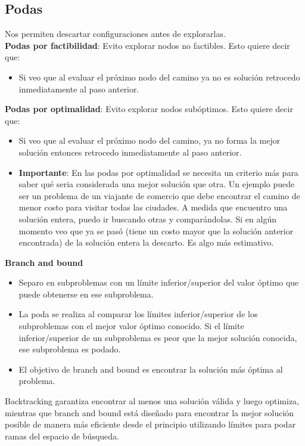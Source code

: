 \documentclass[10pt,a4paper]{article}
\begin{document}
\subsection*{Podas}
Nos permiten descartar configuraciones antes de explorarlas. \\
\textbf{Podas por factibilidad}: Evito explorar nodos no factibles. Esto quiere decir que:
\begin{itemize}
    \item Si veo que al evaluar el próximo nodo del camino ya no es solución retrocedo inmediatamente al paso anterior.
\end{itemize}
\textbf{Podas por optimalidad}: Evito explorar nodos subóptimos. Esto quiere decir que: 
\begin{itemize}
    \item Si veo que al evaluar el próximo nodo del camino, ya no forma la mejor solución entonces retrocedo inmediatamente al paso anterior.
    \item \textbf{Importante}: En las podas por optimalidad se necesita un criterio más para saber qué seria considerada una mejor solución que otra. Un ejemplo puede ser un problema de un viajante de comercio que debe encontrar el camino de menor costo para visitar todas las ciudades. A medida que encuentro una solución entera, puedo ir buscando otras y comparándolas. Si en algún momento veo que ya se pasó (tiene un costo mayor que la solución anterior encontrada) de la solución entera la descarto. Es algo más estimativo.
\end{itemize}
\textbf{Branch and bound} 
\begin{itemize}
    \item Separo en subproblemas con un límite inferior/superior del valor óptimo que puede obtenerse en ese subproblema.
    \item La poda se realiza al comparar los límites inferior/superior de los subproblemas con el mejor valor óptimo conocido. Si el límite inferior/superior de un subproblema es peor que la mejor solución conocida, ese subproblema es podado.
    \item El objetivo de branch and bound es encontrar la solución más óptima al problema.
\end{itemize}
Backtracking garantiza encontrar al menos una solución válida y luego optimiza, mientras que branch and bound está diseñado para encontrar la mejor solución posible de manera más eficiente desde el principio utilizando límites para podar ramas del espacio de búsqueda. \\
\end{document}
